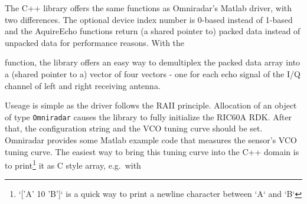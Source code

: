 \begin{Shaded}
\begin{Highlighting}[]
\NormalTok{(}
\NormalTok{)}
\end{Highlighting}
\end{Shaded}

The C++ library offers the same functions as Omniradar's Matlab driver,
with two differences. The optional device index number is 0-based
instead of 1-based and the AquireEcho functions return (a shared pointer
to) packed data instead of unpacked data for performance reasons. With
the

\begin{Shaded}
\begin{Highlighting}[]
 
\end{Highlighting}
\end{Shaded}

function, the library offers an easy way to demultiplex the packed data
array into a (shared pointer to a) vector of four vectors - one for each
echo signal of the I/Q channel of left and right receiving antenna.

Useage is simple as the driver follows the RAII principle. Allocation of
an object of type \texttt{Omniradar} causes the library to fully
initialize the RIC60A RDK. After that, the configuration string and the
VCO tuning curve should be set. Omniradar provides some Matlab example
code that measures the sensor's VCO tuning curve. The easiest way to
bring this tuning curve into the C++ domain is to
print\footnote{`['A' 10 'B']` is a quick way to print a newline character between `A` and `B`}
it as C style array, e.g.~with

\begin{Shaded}
\begin{Highlighting}[]
\NormalTok{[}    \NormalTok{]}
\end{Highlighting}
\end{Shaded}

